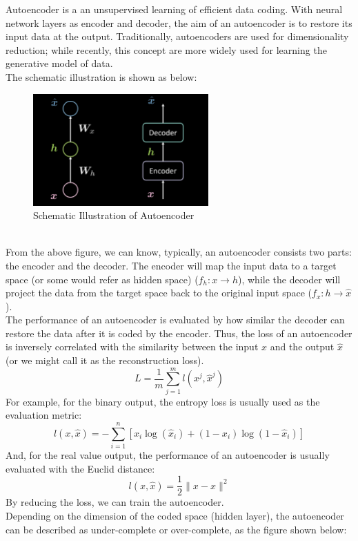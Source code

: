 Autoencoder is a an unsupervised learning of efficient data coding. With neural network layers as encoder and decoder, the aim of an autoencoder is to restore its input data at the output. Traditionally, autoencoders are used for dimensionality reduction; while recently, this concept are more widely used for learning the generative model of data.
\\
The schematic illustration is shown as below:
\\
\begin{figure}[htb]
    \centering
    \includegraphics[width=0.6\textwidth]{labs/10/images/Schematic_Illustration_of_Autoencoder.png}
    \caption{Schematic Illustration of Autoencoder}
    \label{fig:Schematic_Illustration_of_Autoencoder}
\end{figure}
\\
From the above figure, we can know, typically, an autoencoder consists two parts: the encoder and the decoder. The encoder will map the input data to a target space (or some would refer as hidden space) ($f_h: x\rightarrow h$), while the decoder will project the data from the target space back to the original input space ($f_x: h\rightarrow \hat{x}$).
\\
The performance of an autoencoder is evaluated by how similar the decoder can restore the data after it is coded by the encoder. Thus, the loss of an autoencoder is inversely correlated with the similarity between the input $x$ and the output $\hat{x}$ (or we might call it as the reconstruction loss). 
$$ L=\frac{1}{m}\sum_{j=1}^m l(x^j,\hat{x}^j) $$
For example, for the binary output, the entropy loss is usually used as the evaluation metric:
$$ l(x,\hat{x}) = -\sum_{i=1}^n[x_i\log(\hat{x}_i) + (1-x_i)\log(1-\hat{x}_i) ]$$
And, for the real value output, the performance of an autoencoder is usually evaluated with the Euclid distance:
$$ l(x,\hat{x}) = \frac{1}{2} \| x-\hat{x} \|^2 $$
By reducing the loss, we can train the autoencoder.
\\
Depending on the dimension of the coded space (hidden layer), the autoencoder can be described as under-complete or over-complete, as the figure shown below:
